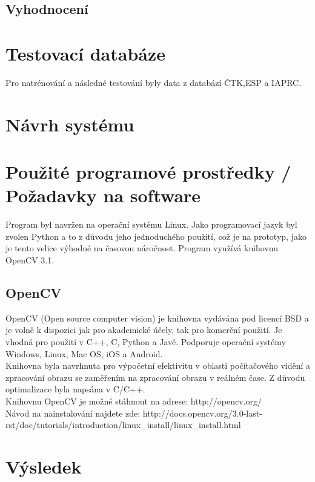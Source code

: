 \documentclass[czech,BP]{thesiskiv}
\begin{document}
\section{Vyhodnocení}

\chapter{Testovací databáze}
Pro natrénování a následné testování byly data z databází ČTK,ESP a IAPRC.
\chapter{Návrh systému}
\chapter{Použité programové prostředky / Požadavky na software}
Program byl navržen na operační systému Linux. Jako programovací jazyk byl zvolen Python a to z důvodu jeho jednoduchého použití, což je na prototyp, jako je tento velice výhodné na časovou náročnost. Program využívá knihovnu OpenCV 3.1.   
\section{OpenCV}
OpenCV (Open source computer vision) je knihovna vydávána pod licencí BSD a je volně k dispozici jak pro akademické účely, tak pro komerční použití. Je vhodná pro použití v C++, C, Python a Javě. Podporuje operační systémy Windows, Linux, Mac OS, iOS a Android.
\\
Knihovna byla navrhnuta pro výpočetní efektivitu v oblasti počítačového vidění a zpracování obrazu se zaměřením na zpracování obrazu v reálném čase. Z důvodu optimalizace byla napsána v C/C++. 
\\
Knihovnu OpenCV je možné stáhnout na adrese: http://opencv.org/
\\
Návod na nainstalování najdete zde: http://docs.opencv.org/3.0-last-rst/doc/tutorials/introduction/linux_install/linux_install.html

\chapter{Výsledek}
\end{document}
